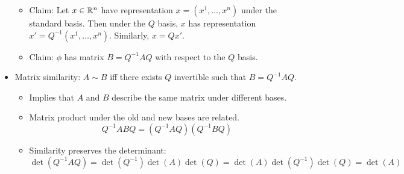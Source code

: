 \documentclass[../notes.tex]{subfiles}
\begin{document}
\begin{itemize}
\begin{itemize}
        \item Claim: Let $x\in\mathbb{R}^n$ have representation $x=(x^1,\dots,x^n)$ under the standard basis. Then under the $Q$ basis, $x$ has representation $x'=Q^{-1}(x^1,\dots,x^n)$. Similarly, $x=Qx'$.
        \item Claim: $\phi$ has matrix $B=Q^{-1}AQ$ with respect to the $Q$ basis.
    \end{itemize}
    \item Matrix similarity: $A\sim B$ iff there exists $Q$ invertible such that $B=Q^{-1}AQ$.
    \begin{itemize}
        \item Implies that $A$ and $B$ describe the same matrix under different bases.
        \item Matrix product under the old and new bases are related.
        \begin{equation*}
            Q^{-1}ABQ = (Q^{-1}AQ)(Q^{-1}BQ)
        \end{equation*}
        \item Similarity preserves the determinant:
        \begin{equation*}
            \det(Q^{-1}AQ) = \det(Q^{-1})\det(A)\det(Q)
            = \det(A)\det(Q^{-1})\det(Q)
            = \det(A)
        \end{equation*}
    \end{itemize}
\end{itemize}
\end{document}
